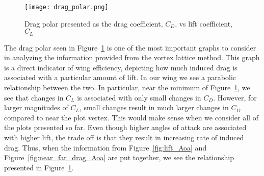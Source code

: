 \documentclass{article}
\begin{document}
\begin{figure}[H]
    \centering
    \texttt{[image: drag\_polar.png]}
    \caption{Drag polar presented as the drag coefficient, $C_D$, vs lift coefficient, $C_L$}\label{fig:drag_polar}
\end{figure}
The drag polar seen in Figure~\ref{fig:drag_polar} is one of the most important graphs to consider in analyzing the information provided from the vortex lattice method. This graph
is a direct indicator of wing efficiency, depicting how much induced drag is associated with a particular amount of lift. In our wing we see a parabolic relationship between the two.
In particular, near the minimum of Figure~\ref{fig:drag_polar}, we see that changes in $C_L$ is associated with only small changes in $C_D$. However, for larger magnitudes of $C_L$, small changes result in much larger
changes in $C_D$ compared to near the plot vertex. This would make sense when we consider all of the plots presented so far. Even though higher angles of attack are associated with higher lift, the trade off is that they result in increasing rate of induced drag. Thus, when the information from Figure~\ref{fig:lift_Aoa} and Figure~\ref{fig:near_far_drag_Aoa} are put together, we see the relationship presented in Figure~\ref{fig:drag_polar}.
\end{document}
